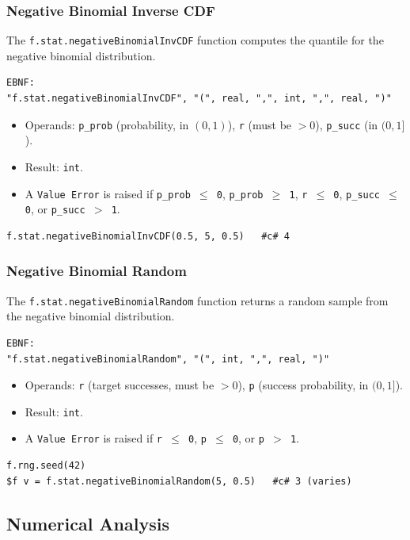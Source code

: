 \subsubsection{Negative Binomial Inverse CDF}
The \texttt{f.stat.negativeBinomialInvCDF} function computes the quantile for the negative binomial distribution.
\begin{verbatim}
EBNF:
"f.stat.negativeBinomialInvCDF", "(", real, ",", int, ",", real, ")"
\end{verbatim}
\begin{itemize}
\item Operands: \texttt{p\_prob} (probability, in $(0, 1)$), \texttt{r} (must be $> 0$), \texttt{p\_succ} (in $(0, 1]$).
\item Result: \texttt{int}.
\item A \texttt{Value Error} is raised if \texttt{p\_prob $\leq$ 0}, \texttt{p\_prob $\geq$ 1}, \texttt{r $\leq$ 0}, \texttt{p\_succ $\leq$ 0}, or \texttt{p\_succ $>$ 1}.
\end{itemize}
\begin{verbatim}
f.stat.negativeBinomialInvCDF(0.5, 5, 0.5)   #c# 4
\end{verbatim}

\subsubsection{Negative Binomial Random}
The \texttt{f.stat.negativeBinomialRandom} function returns a random sample from the negative binomial distribution.
\begin{verbatim}
EBNF:
"f.stat.negativeBinomialRandom", "(", int, ",", real, ")"
\end{verbatim}
\begin{itemize}
\item Operands: \texttt{r} (target successes, must be $> 0$), \texttt{p} (success probability, in $(0, 1]$).
\item Result: \texttt{int}.
\item A \texttt{Value Error} is raised if \texttt{r $\leq$ 0}, \texttt{p $\leq$ 0}, or \texttt{p $>$ 1}.
\end{itemize}
\begin{verbatim}
f.rng.seed(42)
$f v = f.stat.negativeBinomialRandom(5, 0.5)   #c# 3 (varies)
\end{verbatim}

\subsection{Numerical Analysis}

